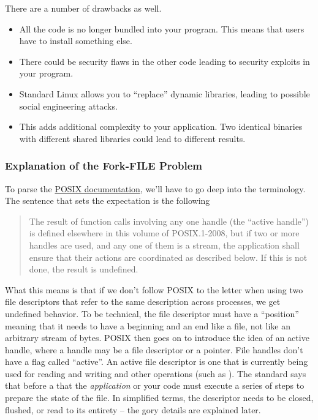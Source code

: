 There are a number of drawbacks as well.

\begin{itemize}
\item All the code is no longer bundled into your program. This means that users have to install something else.
\item There could be security flaws in the other code leading to security exploits in your program.
\item Standard Linux allows you to ``replace'' dynamic libraries, leading to possible social engineering attacks.
\item This adds additional complexity to your application. Two identical binaries with different shared libraries could lead to different results.
\end{itemize}



\subsubsection{Explanation of the Fork-FILE Problem}

To parse the \href{http://pubs.opengroup.org/onlinepubs/9699919799.2008edition/functions/V2_chap02.html}{POSIX documentation}, we'll have to go deep into the terminology.
The sentence that sets the expectation is the following

\begin{quote}
The result of function calls involving any one handle (the ``active handle'') is defined elsewhere in this volume of POSIX.1-2008, but if two or more handles are used, and any one of them is a stream, the application shall ensure that their actions are coordinated as described below. If this is not done, the result is undefined.
\end{quote}

What this means is that if we don't follow POSIX to the letter when using two file descriptors that refer to the same description across processes, we get undefined behavior.
To be technical, the file descriptor must have a ``position'' meaning that it needs to have a beginning and an end like a file, not like an arbitrary stream of bytes.
POSIX then goes on to introduce the idea of an active handle, where a handle may be a file descriptor or a  pointer.
File handles don't have a flag called ``active''.
An active file descriptor is one that is currently being used for reading and writing and other operations (such as ).
The standard says that before a  that the \textit{application} or your code must execute a series of steps to prepare the state of the file.
In simplified terms, the descriptor needs to be closed, flushed, or read to its entirety -- the gory details are explained later.

